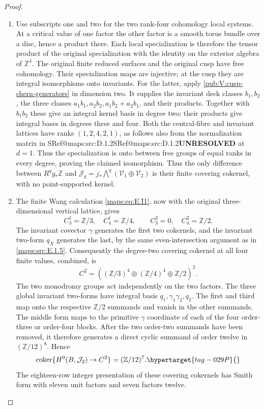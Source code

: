 \documentclass[11pt,a4paper]{article}
\makeatletter
\numberwithin{equation}{section}
\theoremstyle{definition}
\newcommand{\SeriesRefText}[1]{\ifcsname SRef@#1\endcsname\csname SRef@#1\endcsname\else\textbf{UNRESOLVED}\fi}
\newcommand{\SeriesRef}[1]{\ifmmode\text{\SeriesRefText{#1}}\else\SeriesRefText{#1}\fi}
\makeatother
\begin{document}
\begin{proof}
\begin{enumerate}[label=\arabic*.,leftmargin=*]
\item Use subscripts one and two for the two rank-four cohomology
local systems. At a critical value of one factor the other
factor is a smooth torus bundle over a disc, hence a product
there. Each local specialization is therefore the tensor
product of the original specialization with the identity on
the exterior algebra of \(\mathbb Z^4\). The original finite
reduced surfaces and the original cusp have free cohomology.
Their specialization maps are injective; at the cusp they
are integral isomorphisms onto invariants. For the latter,
apply \cref{pub:V:cusp-chern-generators} in dimension two. It supplies the invariant deck classes
\(b_1,b_2\), the three classes
\(a_1b_1,a_2b_2,a_1b_2+a_2b_1\), and their products.
Together with \(b_1b_2\) these give an integral kernel
basis in degree two; their products give integral bases
in degrees three and four. Both the central-fibre and
invariant lattices have ranks \((1,2,4,2,1)\), as follows
also from the normalization matrix in \SeriesRef{maps:src:D.1.2} at \(d=1\).
Thus the specialization is onto between free groups of
equal ranks in every degree, proving the claimed isomorphism.
Thus the only difference between \(R^qg_*\mathbb Z\) and
\(\mathcal J_q=j_*\bigwedge^q(\mathcal V_1\oplus\mathcal V_2)\)
is their finite covering cokernel, with no point-supported kernel.

\item The finite Wang calculation \eqref{maps:eq:E.I1}, now with the original
three-dimensional vertical lattice, gives
\[
 C_3^1=\mathbb Z/3,\quad C_4^1=\mathbb Z/4,
 \qquad C_3^2=0,\quad C_4^2=\mathbb Z/2.
\]
The invariant covector \(\gamma\) generates the first two
cokernels, and the invariant two-form \(q_X\) generates the
last, by the same even-intersection argument as in \ref{maps:src:E.1.5}.
Consequently the degree-two covering cokernel at all four
finite values, combined, is
\[
 C^2=\left((\mathbb Z/3)^4\oplus
                 (\mathbb Z/4)^4\oplus\mathbb Z/2\right)^2.
\]
The two monodromy groups act independently on the two factors.
The three global invariant two-forms have integral basis
\(q_1,\gamma_1\gamma_2,q_2\). The first and third map
onto the respective \(\mathbb Z/2\) summands and vanish
in the other summands. The middle form maps to the primitive
\(\gamma\) coordinate of each of the four order-three or
order-four blocks. After the two order-two summands have
been removed, it therefore generates a direct cyclic summand
of order twelve in \((\mathbb Z/12)^8\). Hence
\begin{equation}
 \operatorname{coker}\{H^0(B,\mathcal J_2)\to C^2\}
      =(\mathbb Z/12)^7.
 \hypertarget{tag-029P}{}\label{maps:eq:E.20}
\end{equation}
The eighteen-row integer presentation of these covering cokernels has
Smith form with eleven unit factors and seven factors twelve.


\end{enumerate}
\end{proof}
\end{document}
